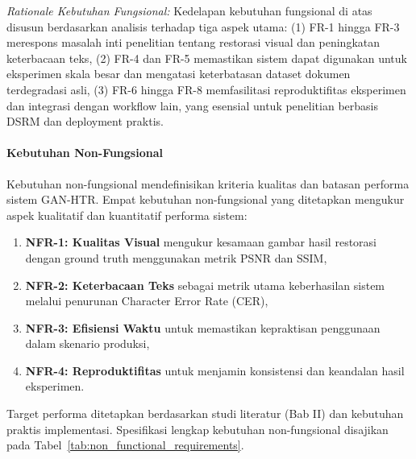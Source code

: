 \documentclass[12pt,a4paper]{book}
\begin{document}
\textit{Rationale Kebutuhan Fungsional:} Kedelapan kebutuhan fungsional di atas disusun berdasarkan analisis terhadap tiga aspek utama: (1) FR-1 hingga FR-3 merespons masalah inti penelitian tentang restorasi visual dan peningkatan keterbacaan teks, (2) FR-4 dan FR-5 memastikan sistem dapat digunakan untuk eksperimen skala besar dan mengatasi keterbatasan dataset dokumen terdegradasi asli, (3) FR-6 hingga FR-8 memfasilitasi reproduktifitas eksperimen dan integrasi dengan workflow lain, yang esensial untuk penelitian berbasis DSRM dan deployment praktis.

\paragraph{Kebutuhan Non-Fungsional}

Kebutuhan non-fungsional mendefinisikan kriteria kualitas dan batasan performa sistem GAN-HTR. Empat kebutuhan non-fungsional yang ditetapkan mengukur aspek kualitatif dan kuantitatif performa sistem:

\begin{enumerate}[nosep]
    \item \textbf{NFR-1: Kualitas Visual} mengukur kesamaan gambar hasil restorasi dengan ground truth menggunakan metrik PSNR dan SSIM,
    \item \textbf{NFR-2: Keterbacaan Teks} sebagai metrik utama keberhasilan sistem melalui penurunan Character Error Rate (CER),
    \item \textbf{NFR-3: Efisiensi Waktu} untuk memastikan kepraktisan penggunaan dalam skenario produksi,
    \item \textbf{NFR-4: Reproduktifitas} untuk menjamin konsistensi dan keandalan hasil eksperimen.
\end{enumerate}

Target performa ditetapkan berdasarkan studi literatur (Bab II) dan kebutuhan praktis implementasi. Spesifikasi lengkap kebutuhan non-fungsional disajikan pada Tabel~\ref{tab:non_functional_requirements}.
\end{document}
